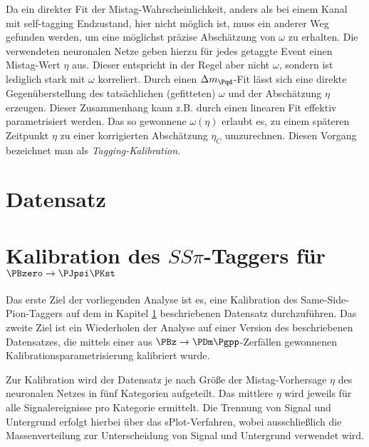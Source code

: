 Da ein direkter Fit der Mistag-Wahrscheinlichkeit, anders als bei einem Kanal mit self-tagging Endzustand, hier nicht möglich ist, muss ein anderer Weg gefunden werden, um eine möglichst präzise Abschätzung von $ω$ zu erhalten.
Die verwendeten neuronalen Netze geben hierzu für jedes getaggte Event einen Mistag-Wert $η$ aus.
Dieser entspricht in der Regel aber nicht $ω$, sondern ist lediglich stark mit $ω$ korreliert.
Durch einen $\difference{m_{\Pqd}}$-Fit lässt sich eine direkte Gegenüberstellung des tatsächlichen (gefitteten) $ω$ und der Abschätzung $η$ erzeugen. Dieser Zusammenhang kann z.B. durch einen linearen Fit effektiv parametrisiert werden. Das so gewonnene $ω(η)$ erlaubt es, zu einem späteren Zeitpunkt $η$ zu einer korrigierten Abschätzung $η_C$ umzurechnen.
Diesen Vorgang bezeichnet man als \emph{Tagging-Kalibration}.



\section{Datensatz}
\label{datensatz}


\section{\texorpdfstring{Kalibration des $SS\pi$-Taggers für $\PBzero \to \PJpsi \PKst$}{Kalibration des SSpi-Taggers für B0 -> JpsiKst}}

Das erste Ziel der vorliegenden Analyse ist es, eine Kalibration des Same-Side-Pion-Taggers auf dem in Kapitel \ref{datensatz} beschriebenen Datensatz durchzuführen.
Das zweite Ziel ist ein Wiederholen der Analyse auf einer Version des beschriebenen Datensatzes, die mittels einer aus $\PBz \to \PDm\Pgpp$-Zerfällen gewonnenen Kalibrationsparametrisierung kalibriert wurde.

Zur Kalibration wird der Datensatz je nach Größe der Mistag-Vorhersage $η$ des neuronalen Netzes in fünf Kategorien aufgeteilt.
Das mittlere $η$ wird jeweils für alle Signalereignisse pro Kategorie ermittelt.
Die Trennung von Signal und Untergrund erfolgt hierbei über das sPlot-Verfahren\cite{splot}, wobei ausschließlich die Massenverteilung zur Unterscheidung von Signal und Untergrund verwendet wird.

